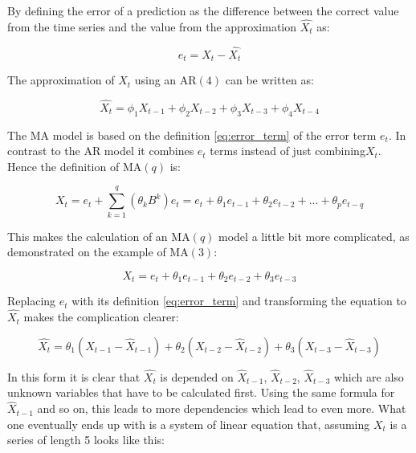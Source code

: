 By defining the error of a prediction as the difference between the correct value from the time series and the value from the approximation \(\hat{X_t}\) as: 

\begin{equation}\label{eq:error_term}
	e_t = X_t - \hat{X_t}
\end{equation}

The approximation of \(X_t\) using an \acs{AR}\((4)\) can be written as:

\begin{equation}\label{eq:AR_four}
  \hat{X_t} = \phi_1 X_{t-1}+ \phi_2 X_{t-2}+ \phi_3 X_{t-3}+ \phi_4 X_{t-4}
\end{equation}

The \acl{MA} model is based on the definition \eqref{eq:error_term} of the error term \(e_t\). In contrast to the \acs{AR} model it combines \(e_t\) terms instead of just combining\(X_t\). Hence the definition of \acs{MA}\((q)\) is:

\begin{equation}\label{eq:MA_q}
	X_t = e_t + \displaystyle\sum_{k=1}^{q} (\theta_k B^k) e_t = e_t + \theta_1 e_{t-1}+ \theta_2 e_{t-2}+ ... + \theta_p e_{t-q}
\end{equation}

This makes the calculation of an \acs{MA}\((q)\) model a little bit more complicated, as demonstrated on the example of \acs{MA}\((3)\):

\begin{equation}\label{eq:example_MA_three_1}
	X_t = e_t + \theta_1 e_{t-1}+ \theta_2 e_{t-2} + \theta_3 e_{t-3}
\end{equation}

Replacing \(e_t\) with its definition \eqref{eq:error_term} and transforming the equation to \(\hat{X_t}\) makes the complication clearer:

\begin{equation}\label{eq:example_MA_three_2}
	\hat{X_t} =\theta_1 (X_{t-1} - {\hat{X}}_{t-1}) + \theta_2 (X_{t-2} - {\hat{X}}_{t-2}) + \theta_3 (X_{t-3} - {\hat{X}}_{t-3})
\end{equation}

In this form it is clear that \(\hat{X_t}\) is depended on \({\hat{X}}_{t-1}\), \({\hat{X}}_{t-2}\), \({\hat{X}}_{t-3}\) which are also unknown variables that have to be calculated first. Using the same formula for \({\hat{X}}_{t-1}\) and so on, this leads to more dependencies which lead to even more. What one eventually ends up with is a system of linear equation that, assuming \(X_t\) is a series of length 5 looks like this: 

